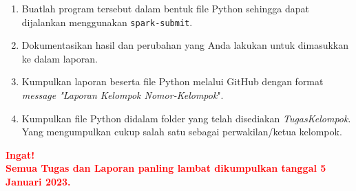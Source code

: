 \documentclass[a4paper]{tufte-handout}
\begin{document}
\begin{enumerate}
\item Buatlah program tersebut dalam bentuk file Python sehingga dapat dijalankan menggunakan {\tt spark-submit}.
\item Dokumentasikan hasil dan perubahan yang Anda lakukan untuk dimasukkan ke dalam laporan.
\item Kumpulkan laporan beserta file Python melalui GitHub dengan format \textit{message "Laporan Kelompok Nomor-Kelompok}".
\item Kumpulkan file Python didalam folder yang telah disediakan \textit{TugasKelompok}. Yang mengumpulkan cukup salah satu sebagai perwakilan/ketua kelompok.
\end{enumerate}

\hrulefill

\begin{center}
\noindent
\textbf{\textcolor{red}{Ingat!\\ Semua Tugas dan Laporan panling lambat dikumpulkan tanggal 5 Januari 2023.}}
\end{center}

\hrulefill
\end{document}
